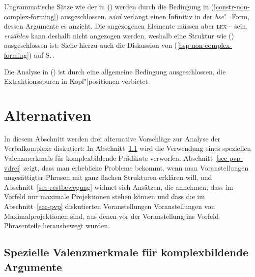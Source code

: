 \clearpage
\noindent
Ungrammatische Sätze wie der in () werden durch die Bedingung
in (\ref{constr-non-complex-forming}) ausgeschlossen.
\z
\emph{wird} verlangt einen Infinitiv in der \emph{bse}"=Form, dessen Argumente
es anzieht. Die angezogenen Elemente müssen aber \textsc{lex}$-$ sein. \emph{erzählen}
kann deshalb nicht angezogen werden, weshalb eine Struktur wie () ausgeschlossen ist:
\z
Siehe hierzu auch die Diskussion von (\ref{bsp-non-complex-forming}) auf S.\,\pageref{bsp-non-complex-forming}.

Die Analyse in () ist durch eine allgemeine Bedingung ausgeschlossen,
die Extraktionsspuren in Kopf"|positionen verbietet.
\z

\section{Alternativen}
\label{sec-alternativen}%

In diesem Abschnitt werden drei alternative Vorschläge zur Analyse der Verbalkomplexe diskutiert:
In Abschnitt~\ref{sec-vcomp} wird die Verwendung eines speziellen Valenzmerkmals für komplexbildende
Prädikate verworfen. Abschnitt~\ref{sec-pvp-vdrei} zeigt, dass man erhebliche Probleme bekommt,
wenn man Voranstellungen ungesättigter Phrasen mit ganz flachen Strukturen erklären will,
und Abschnitt~\ref{sec-restbewegung} widmet sich Ansätzen, die annehmen, dass im Vorfeld nur maximale
Projektionen stehen können und dass die im Abschnitt~\ref{sec-pvp} diskutierten Voranstellungen
Voranstellungen von Maximalprojektionen sind, aus denen vor der Voranstellung ins Vorfeld
Phrasenteile herausbewegt wurden.

\subsection{Spezielle Valenzmerkmale für komplexbildende Argumente}
\label{sec-vcomp}

